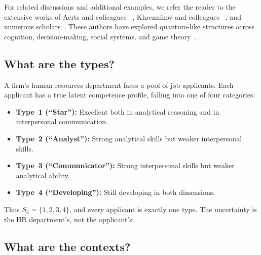 \documentclass[aps,pra,twocolumn,superscriptaddress,floatfix,longbibliography]{revtex4-2}
\begin{document}
For related discussions and additional examples, we refer the reader
to the extensive works of Aerts and colleagues
~\cite{aerts1995applications,aerts2005a,aerts2009experimental,
aerts2013concepts,aerts2022human,aerts2023thermodynamics,
aerts2024quantum,aerts2025quantum}, Khrennikov and colleagues
~\cite{Khrennikov2010,Khrennikov2009-decision,Haven2013-qss,
Khrennikov2015-modeling,Khrennikov2018-neuronal,
khrennikov2020social,Khrennikov2020-rationality}, and numerous
scholars~\cite{franco2009conjunction,lambert2009type,
aerts2010quantum,yukalov2010mathematical,lambert2012quantum,
atmanspacher2012order,yukalov2014conditions,Ashtiani2015-survey,
wendt2015quantum,Asano2015-adaptivity,orrell2016quantum,
yukalov2018quantitative,orrell2020bvalue,arioli2021quantum,
Meghdadi2022-biases,holtfort2023social,Aspalter2024,
Aspalter2024b,Aspalter2025}. These authors have explored
quantum-like structures across cognition, decision-making, social
systems, and game theory~\cite{eisert1999quantum,
sanzmartin2025mapping}.

\subsection{What are the types?}

A firm's human resources department faces a pool of job applicants.
Each applicant has a true latent competence profile, falling into one
of four categories:
\begin{itemize}
\item \textbf{Type~1 (``Star''):} Excellent both in analytical
reasoning and in interpersonal communication.
\item \textbf{Type~2 (``Analyst''):} Strong analytical skills but
weaker interpersonal skills.
\item \textbf{Type~3 (``Communicator''):} Strong interpersonal
skills but weaker analytical ability.
\item \textbf{Type~4 (``Developing''):} Still developing in both
dimensions.
\end{itemize}
Thus $S_4=\{1,2,3,4\}$, and every applicant is exactly one type.
The uncertainty is the HR department's, not the applicant's.

\subsection{What are the contexts?}
\end{document}
